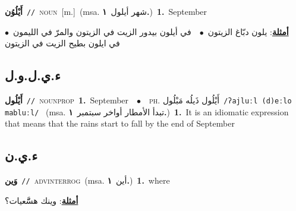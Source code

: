 \documentclass[10pt,a4paper,twoside]{article} %
\begin{document}
\begin{multicols}{2}
{\setlength\topsep{0pt}\textbf{\foreignlanguage{arabic}{أَيْلُوُن}}\ {\color{gray}\texttt{//}\color{black}}\ \textsc{noun}\ [m.]\ \color{gray}(msa. \foreignlanguage{arabic}{شهر أيلول}~\foreignlanguage{arabic}{\textbf{١.}})\color{black}\ \textbf{1.}~September\  \begin{flushright}\color{gray}\foreignlanguage{arabic}{\textbf{\underline{\foreignlanguage{arabic}{أمثلة}}}: يلون دبّاغ الزيتون\ $\bullet$\ \  في أيلون بيدور الزيت في الزيتون والمرّ في الليمون\ $\bullet$\ \  في ايلون بطيح الزيت في الزيتون}\end{flushright}\color{black}} \vspace{2mm}

\vspace{-3mm}
\subsection*{\color{blue}\foreignlanguage{arabic}{ء.ي.ل.و.ل}\color{blue}{ (ntws)}} 

{\setlength\topsep{0pt}\textbf{\foreignlanguage{arabic}{أَيْلُول}}\ {\color{gray}\texttt{//}\color{black}}\ \textsc{noun\textunderscore prop}\ \textbf{1.}~September\ \ $\bullet$\ \ \textsc{ph.} \color{gray} \foreignlanguage{arabic}{أَيْلُول ذَيلُه مَبْلُول}\color{black}\ {\color{gray}\texttt{/{\sffamily ʔajluːl (d)eːlo mabluːl}/}\color{black}}\ \color{gray} (msa. \foreignlanguage{arabic}{تبدأ الأمطار أواخر سبتمبر}~\foreignlanguage{arabic}{\textbf{١.}})\color{black}\ \textbf{1.}~It is an idiomatic expression that means  that the rains start to fall by the end of September\ } \vspace{2mm}

\vspace{-3mm}
\subsection*{\color{blue}\foreignlanguage{arabic}{ء.ي.ن}\color{blue}{ (ntws)}} 

{\setlength\topsep{0pt}\textbf{\foreignlanguage{arabic}{وَين}}\ {\color{gray}\texttt{//}\color{black}}\ \textsc{adv\textunderscore interrog}\ \color{gray}(msa. \foreignlanguage{arabic}{أين}~\foreignlanguage{arabic}{\textbf{١.}})\color{black}\ \textbf{1.}~where\  \begin{flushright}\color{gray}\foreignlanguage{arabic}{\textbf{\underline{\foreignlanguage{arabic}{أمثلة}}}: وينك هسَّّعيات؟}\end{flushright}\color{black}} \vspace{2mm}


\end{multicols}
\end{document}

